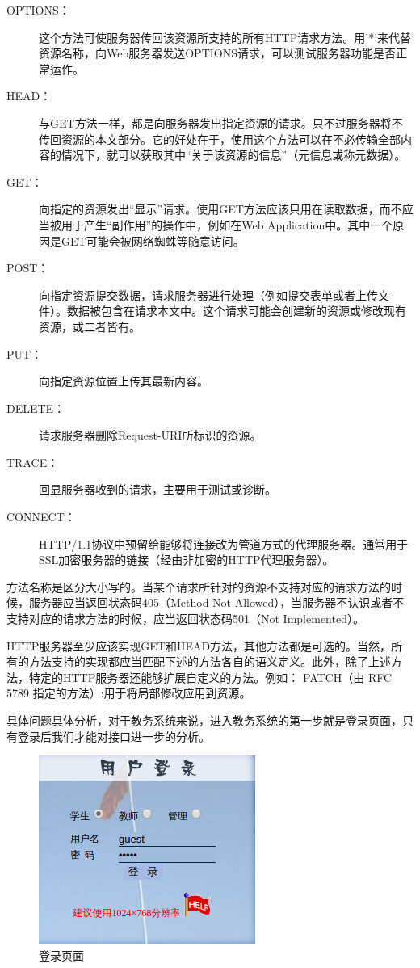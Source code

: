 \documentclass[UTF8, zihao=-4]{ctexart}
\begin{document}
    \begin{description}
        \item[OPTIONS：] 这个方法可使服务器传回该资源所支持的所有HTTP请求方法。用'*'来代替资源名称，向Web服务器发送OPTIONS请求，可以测试服务器功能是否正常运作。
        \item[HEAD：] 与GET方法一样，都是向服务器发出指定资源的请求。只不过服务器将不传回资源的本文部分。它的好处在于，使用这个方法可以在不必传输全部内容的情况下，就可以获取其中“关于该资源的信息”（元信息或称元数据）。
        \item[GET：] 向指定的资源发出“显示”请求。使用GET方法应该只用在读取数据，而不应当被用于产生“副作用”的操作中，例如在Web Application中。其中一个原因是GET可能会被网络蜘蛛等随意访问。
        \item[POST：] 向指定资源提交数据，请求服务器进行处理（例如提交表单或者上传文件）。数据被包含在请求本文中。这个请求可能会创建新的资源或修改现有资源，或二者皆有。
        \item[PUT：] 向指定资源位置上传其最新内容。
        \item[DELETE：] 请求服务器删除Request-URI所标识的资源。
        \item[TRACE：] 回显服务器收到的请求，主要用于测试或诊断。
        \item[CONNECT：] HTTP/1.1协议中预留给能够将连接改为管道方式的代理服务器。通常用于SSL加密服务器的链接（经由非加密的HTTP代理服务器）。
    \end{description}

    方法名称是区分大小写的。当某个请求所针对的资源不支持对应的请求方法的时候，服务器应当返回状态码405（Method Not Allowed），当服务器不认识或者不支持对应的请求方法的时候，应当返回状态码501（Not Implemented）。\par
    HTTP服务器至少应该实现GET和HEAD方法，其他方法都是可选的。当然，所有的方法支持的实现都应当匹配下述的方法各自的语义定义。此外，除了上述方法，特定的HTTP服务器还能够扩展自定义的方法。例如：
PATCH（由 RFC 5789 指定的方法）:用于将局部修改应用到资源。\par
    具体问题具体分析，对于教务系统来说，进入教务系统的第一步就是登录页面，只有登录后我们才能对接口进一步的分析。\par
    
    \begin{figure}
        \centering
        \includegraphics[width=0.5\linewidth]{figure/interface-login}
        \caption{登录页面}
        \label{fig:interface-login}
    \end{figure}
    
\end{document}

